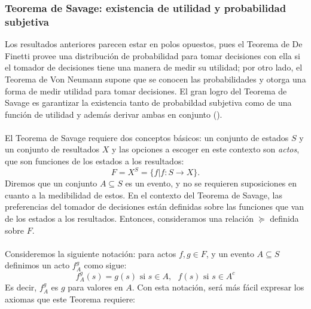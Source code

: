 \documentclass[11pt]{article}
\theoremstyle{plain}
\begin{document}
\subsubsection{Teorema de Savage: existencia de utilidad y probabilidad subjetiva}
Los resultados anteriores parecen estar en polos opuestos, pues el Teorema de De Finetti provee una distribución de probabilidad para tomar decisiones con ella si el tomador de decisiones tiene una manera de medir su utilidad; por otro lado, el Teorema de Von Neumann supone que se conocen las probabilidades y otorga una forma de medir utilidad para tomar decisiones. El gran logro del Teorema de Savage es garantizar la existencia tanto de probabildad subjetiva como de una función de utilidad y además derivar ambas en conjunto (\cite{gilboa2009decision}).\\
\\
\indent El Teorema de Savage requiere dos conceptos básicos: un conjunto de estados $S$ y un conjunto de resultados $X$ y las opciones a escoger en este contexto son \textit{actos}, que son funciones de los estados a los resultados:
\[ F = X^S = \{ f | f: S \to X \}. \]
\indent Diremos que un conjunto $A \subseteq S$ es un evento, y no se requieren suposiciones en cuanto a la medibilidad de estos. En el contexto del Teorema de Savage, las preferencias del tomador de decisiones están definidas sobre las funciones que van de los estados a los resultados. Entonces, consideramos una relación $\succeq$ definida sobre $F$.\\
\\
\indent Consideremos la siguiente notación: para actos $f,g \in F$, y un evento $A \subseteq S$ definimos un acto $f_A^g$ como sigue:
\[ f_A^g(s)=g(s) \textrm{ si  } s \in A, \textrm{  } f(s) \textrm{ si  } s \in A^c   \]
Es decir, $ f_A^g$ es $g$ para valores en $A$. Con esta notación, será más fácil expresar los axiomas que este Teorema requiere:
\end{document}
